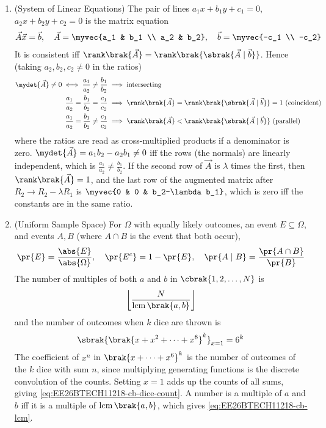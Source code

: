 \begin{enumerate}[label=\thesubsection.\arabic*, ref=\thesubsection.\theenumi,itemsep=1.5em]
\item (System of Linear Equations) The pair of lines $a_1x+b_1y+c_1=0$, $a_2x+b_2y+c_2=0$ is the matrix equation
\begin{align}
\vec{A}\vec{x} = \vec{b}, \quad \vec{A} = \myvec{a_1 & b_1 \\ a_2 & b_2}, \quad \vec{b} = \myvec{-c_1 \\ -c_2}
\label{eq:EE26BTECH11218-cb-linsys}
\end{align}
It is consistent iff $\rank\brak{\vec{A}} = \rank\brak{\sbrak{\vec{A}\mid\vec{b}}}$. Hence (taking $a_2,b_2,c_2\ne0$ in the ratios)
\begin{align}
\mydet{\vec{A}} \ne 0 \iff \frac{a_1}{a_2} \ne \frac{b_1}{b_2} &\implies \text{intersecting} \\
\frac{a_1}{a_2} = \frac{b_1}{b_2} = \frac{c_1}{c_2} &\implies \rank\brak{\vec{A}} = \rank\brak{\sbrak{\vec{A}\mid\vec{b}}} = 1\ \text{(coincident)} \\
\frac{a_1}{a_2} = \frac{b_1}{b_2} \ne \frac{c_1}{c_2} &\implies \rank\brak{\vec{A}} < \rank\brak{\sbrak{\vec{A}\mid\vec{b}}} \text{ (parallel)}
\label{eq:EE26BTECH11218-cb-rank-cases}
\end{align}
where the ratios are read as cross-multiplied products if a denominator is zero.
\solution $\mydet{\vec{A}} = a_1b_2 - a_2b_1 \ne 0$ iff the rows (the normals) are linearly independent, which is $\frac{a_1}{a_2}\ne\frac{b_1}{b_2}$. If the second row of $\vec{A}$ is $\lambda$ times the first, then $\rank\brak{\vec{A}}=1$, and the last row of the augmented matrix after $R_2 \to R_2-\lambda R_1$ is $\myvec{0 & 0 & b_2-\lambda b_1}$, which is zero iff the constants are in the same ratio.

\item (Uniform Sample Space) For $\Omega$ with equally likely outcomes, an event $E\subseteq\Omega$, and events $A,B$ (where $A\cap B$ is the event that both occur),
\begin{align}
\pr{E} = \frac{\abs{E}}{\abs{\Omega}}, \quad \pr{E^{c}} = 1-\pr{E}, \quad
\pr{A\mid B} = \frac{\pr{A\cap B}}{\pr{B}}
\label{eq:EE26BTECH11218-cb-prob}
\end{align}
The number of multiples of both $a$ and $b$ in $\cbrak{1,2,\dots,N}$ is
\begin{align}
\left\lfloor\frac{N}{\operatorname{lcm}\brak{a,b}}\right\rfloor
\label{eq:EE26BTECH11218-cb-lcm}
\end{align}
and the number of outcomes when $k$ dice are thrown is
\begin{align}
\sbrak{\brak{x+x^2+\cdots+x^6}^k}_{x=1} = 6^k
\label{eq:EE26BTECH11218-cb-dice-count}
\end{align}
\solution The coefficient of $x^n$ in $\brak{x+\cdots+x^6}^k$ is the number of outcomes of the $k$ dice with sum $n$, since multiplying generating functions is the discrete convolution of the counts. Setting $x=1$ adds up the counts of all sums, giving \eqref{eq:EE26BTECH11218-cb-dice-count}. A number is a multiple of $a$ and $b$ iff it is a multiple of $\operatorname{lcm}\brak{a,b}$, which gives \eqref{eq:EE26BTECH11218-cb-lcm}.


\end{enumerate}
